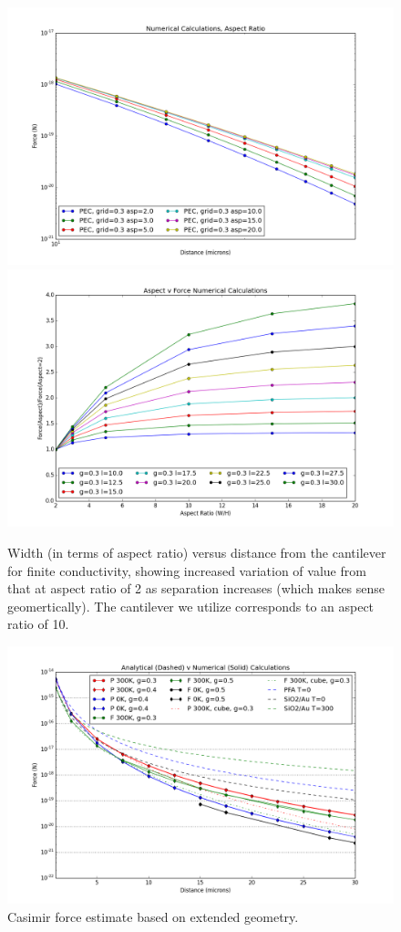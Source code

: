 \documentclass[11pt]{article}
\begin{document}
\begin{figure}[h]
\centering
\includegraphics[width=5in]{force_v_aspect_finite}
\includegraphics[width=5in]{aspect_correction_finite}
\caption{Width (in terms of aspect ratio) versus distance from the cantilever for finite conductivity, showing increased variation of value from that at aspect ratio of 2 as separation increases (which makes sense geomertically). The cantilever we utilize corresponds to an aspect ratio of 10.}\label{fig:aspectFinite}
\end{figure}

\begin{figure}[h]
\centering
\includegraphics[width=7in]{analytic_v_numerical_best}
\caption{Casimir force estimate based on extended geometry.}\label{fig:estimate}
\end{figure}
\end{document}
